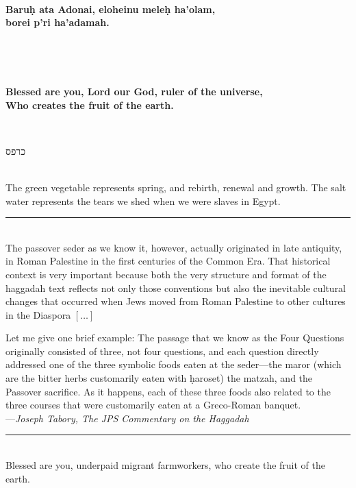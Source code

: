 \documentclass[a4paper,10pt,openany]{memoir}
\newcommand{\HgInst}[1]{{\noindent\sffamily{\bfseries{#1}}}}
\newcommand{\HgEllipsis}{\ensuremath{\left[\ldots\right]}}
\newcommand{\HgSource}[1]{\hfill{\small---\itshape{#1}}}
\newcommand{\hchapter}[1]{
  \begin{hebrew}
    \begin{Spacing}{.97}
      \newpage
      \strut

      \vspace{.15em}

      \noindent\Huge #1

      \vspace{1em}
    \end{Spacing}
  \end{hebrew}
}
\newcommand{\HgHL}[1]{{\Large\textbf{#1}\par\noindent\\[-.5em]}}
\newcommand{\HgFill}{\vfill \hrule \vfill}
\newenvironment{HgEnglish}{\strut\\\noindent}{\vspace{1em}}
\newenvironment{HgTranslit}{\strut\\\noindent\begin{itshape}}{\end{itshape}\vspace{1em}}
\newcommand{\SSrc}{\textsuperscript{\upshape{[S]}}}
\begin{document}
\begin{HgTranslit}
  \HgHL{
  Baru\d{h} ata Adonai, eloheinu mele\d{h} ha'olam, \\
  borei p'ri ha'adamah.
}
\end{HgTranslit}
\vspace{-1em}
\begin{HgEnglish}
  \HgHL{
  Blessed are you, Lord our God, ruler of the universe, \\
  Who creates the fruit of the earth.
  }
\end{HgEnglish}

\HgInst{Eat the parsely.}

\vfill

\hchapter{כרפס}

\begin{HgEnglish}
The green vegetable represents spring, and rebirth, renewal and growth. The salt
water represents the tears we shed when we were slaves in Egypt.
\end{HgEnglish}

\HgFill

\begin{HgEnglish}
  The passover seder as we know it, however, actually originated in late
  antiquity, in Roman Palestine in the first centuries of the Common Era. That
  historical context is very important because both the very structure and
  format of the haggadah text reflects not only those conventions but also the
  inevitable cultural changes that occurred when Jews moved from Roman Palestine
  to other cultures in the Diaspora \HgEllipsis

  Let me give one brief example: The passage that we know as the
  Four Questions originally consisted of three, not four questions, and each
  question directly addressed one of the three symbolic foods eaten at the
  seder---the maror (which are the bitter herbs customarily eaten with
  \d{h}aroset) the matzah, and the Passover sacrifice. As it happens, each of
  these three foods also related to the three courses that were customarily
  eaten at a Greco-Roman banquet. \\

  \HgSource{Joseph Tabory, The JPS Commentary on the Haggadah}
\end{HgEnglish}

\HgFill

\begin{HgEnglish}
  Blessed are you, underpaid migrant farmworkers, who create the fruit of the
  earth.\SSrc
\end{HgEnglish}
\end{document}
